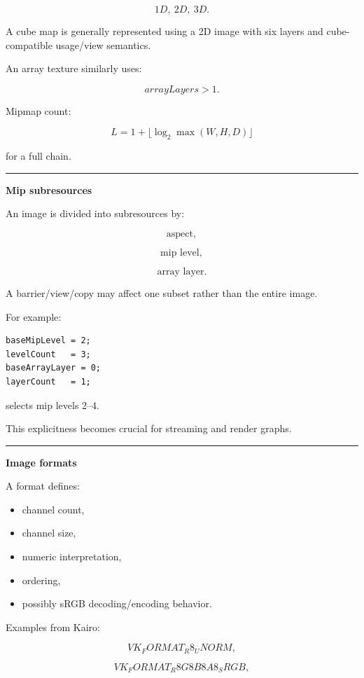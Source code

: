 \[
1D,\ 2D,\ 3D.
\]

A cube map is generally represented using a 2D image with six layers and cube-compatible usage/view semantics.

An array texture similarly uses:

\[
arrayLayers>1.
\]

Mipmap count:

\[
L=
1+
\lfloor
\log_2
\max(W,H,D)
\rfloor
\]

for a full chain.

\begin{center}\rule{0.5\linewidth}{0.5pt}\end{center}

\textbf{Mip subresources}

An image is divided into subresources by:

\[
\text{aspect},
\]

\[
\text{mip level},
\]

\[
\text{array layer}.
\]

A barrier/view/copy may affect one subset rather than the entire image.

For example:

\begin{verbatim}
baseMipLevel = 2;
levelCount   = 3;
baseArrayLayer = 0;
layerCount   = 1;
\end{verbatim}

selects mip levels 2--4.

This explicitness becomes crucial for streaming and render graphs.

\begin{center}\rule{0.5\linewidth}{0.5pt}\end{center}

\textbf{Image formats}

A format defines:

\begin{itemize}
\tightlist
\item
  channel count,
\item
  channel size,
\item
  numeric interpretation,
\item
  ordering,
\item
  possibly sRGB decoding/encoding behavior.
\end{itemize}

Examples from Kairo:

\[
VK_FORMAT_R8_UNORM,
\]

\[
VK_FORMAT_R8G8B8A8_SRGB,
\]

